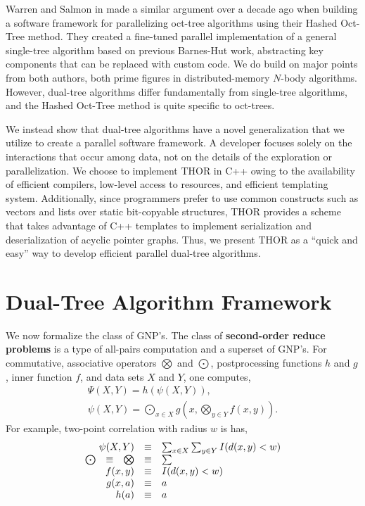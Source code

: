 \documentclass[twoside,leqno,twocolumn]{article}
\newcommand{\authornote}[1]{(\footnote{Note to self: #1})}
\newcommand{\authorsnote}[1]{\authornote{#1}}
\newcommand{\Gnp}{\Psi}
\newcommand{\gnp}{\psi}
\newcommand{\defterm}[1]{{\bf #1}}
\begin{document}
Warren and Salmon in \cite{warren95portable} made a similar argument over a decade ago when building a software framework for parallelizing oct-tree algorithms using their Hashed Oct-Tree method.
They created a fine-tuned parallel implementation of a general single-tree algorithm based on previous Barnes-Hut work, abstracting key components that can be replaced with custom code.
We do build on major points from both authors, both prime figures in distributed-memory $N$-body algorithms.
However, dual-tree algorithms differ fundamentally from single-tree algorithms, and the Hashed Oct-Tree method is quite specific to oct-trees.

We instead show that dual-tree algorithms have a novel generalization that we utilize to create a parallel software framework.
A developer focuses solely on the interactions that occur among data, not on the details of the exploration or parallelization.
We choose to implement THOR in C++ owing to the availability of efficient compilers, low-level access to resources, and efficient templating system.
Additionally, since programmers prefer to use common constructs such as vectors and lists over static bit-copyable structures, THOR provides a scheme that takes advantage of C++ templates to implement serialization and deserialization of acyclic pointer graphs.
Thus, we present THOR as a ``quick and easy'' way to develop efficient parallel dual-tree algorithms.%

\section{Dual-Tree Algorithm Framework}

We now formalize the class of GNP's.
The class of \defterm{second-order reduce problems} is a type of all-pairs computation and a superset of GNP's.
For commutative, associative operators $\bigotimes$ and $\bigodot$, postprocessing functions $h$ and $g$, inner function $f$, and data sets $X$ and $Y$, one computes,
\[\begin{array}{l}
  \displaystyle \Gnp(X, Y) = h(\gnp(X, Y)),
  \\
  \displaystyle \gnp(X, Y) = \bigodot_{x \in X} g\!\left(x, \bigotimes_{y \in Y} f(x, y) \right).
\end{array}\]
\noindent
For example, two-point correlation with radius $w$ is has,
\[\begin{array}{ccccl}
  \multicolumn{3}{r}{\gnp(X, Y)} &\equiv& \sum_{x \in X} \sum_{y \in Y} I(d(x, y) < w)
  \\
  \bigodot &\equiv& \bigotimes &\equiv& \sum
  \\
  \multicolumn{3}{r}{f(x,y)} &\equiv& I(d(x,y) < w)
  \\
  \multicolumn{3}{r}{g(x, a)} &\equiv& a
  \\
  \multicolumn{3}{r}{h(a)} &\equiv& a
\end{array}\]
\end{document}
